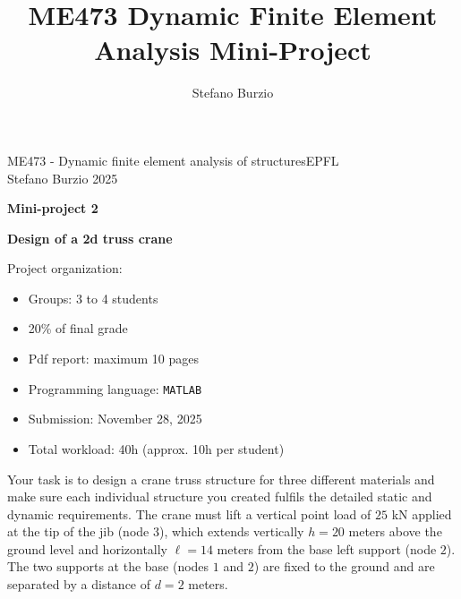 \documentclass[12pt]{article}
\title{ME473 Dynamic Finite Element Analysis Mini-Project}
\author{Stefano Burzio}
\date{}
\begin{document}
\noindent ME473 - Dynamic finite element analysis of structures\hfill EPFL\\
Stefano Burzio \hfill 2025\\
\vspace{0.3cm}

\hspace*{\fill}\textbf{\Large Mini-project 2}\hspace*{\fill}
\begin{center}
  \textbf{\Large Design of a 2d truss crane}
\end{center}

\hrulefill
\vspace{0.3cm}
\newline
{Project organization:}
\vspace{0.2cm}
\newline
\begin{minipage}[t]{0.38\textwidth}
  \begin{itemize}[itemsep=0.005cm]
    \item Groups: 3 to 4 students
    \item 20\% of final grade
    \item Pdf report: maximum 10 pages
  \end{itemize}
\end{minipage}
\hfill
\begin{minipage}[t]{0.58\textwidth}
  \begin{itemize}[itemsep=0.005cm]
    \item Programming language: \texttt{MATLAB}
    \item Submission: November 28, 2025
    \item Total workload: 40h (approx. 10h per student)
  \end{itemize}
\end{minipage}
\vspace{0.3cm}

\hrulefill
\vspace{0.3cm}

Your task is to design a crane truss structure for three different materials and make sure each individual structure you created fulfils the detailed static and dynamic requirements. The crane must lift a vertical point load of $25$ kN applied at the tip of the jib (node $3$), which extends vertically $h=20$ meters above the ground level and horizontally $\ell=14$ meters from the base left support (node $2$). The two supports at the base (nodes $1$ and $2$) are fixed to the ground and are separated by a distance of $d=2$ meters.
\end{document}
